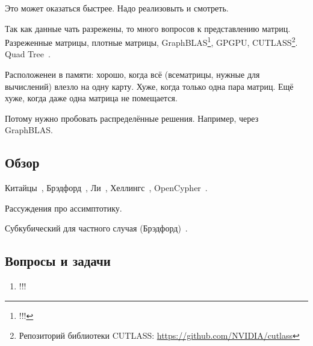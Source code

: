 Это может оказаться быстрее. Надо реализовыть и смотреть.

Так как данные чать разрежены, то много вопросов к представлению матриц.
Разреженные матрицы, плотные матрицы, GraphBLAS\footnote{!!!}, GPGPU, CUTLASS\footnote{Репозиторий библиотеки CUTLASS: \url{https://github.com/NVIDIA/cutlass}}.
Quad Tree~\cite{!!!}.

Расположенеи в памяти: хорошо, когда всё (всематрицы, нужные для вычислений) влезло на одну карту.
Хуже, когда только одна пара матриц.
Ещё хуже, когда даже одна матрица не помещается.

Потому нужно пробовать распределённые решения.
Например, через GraphBLAS.

\subsection{Обзор}

Китайцы~\cite{!!!}, Брэдфорд~\cite{!!!}, Ли~\cite{Lee:2002:FCG:505241.505242}, Хеллингс~\cite{!!!}, OpenCypher~\cite{Kuijpers:2019:ESC:3335783.3335791}.

Рассуждения про ассимптотику.

Субкубический для частного случая (Брэдфорд)~\cite{8249039}.

\subsection{Вопросы и задачи}
\begin{enumerate}
  \item !!!
\end{enumerate}
